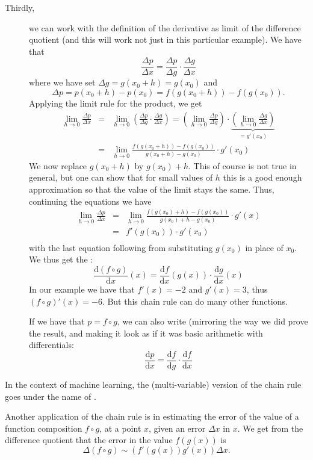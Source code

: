 \begin{description}
\item[Thirdly,] we can work with the definition of the derivative as limit
of the difference quotient (and this
will work not just in this particular example). We have that
\[
\frac{\Delta p}{\Delta x}=\frac{\Delta p}{\Delta g}\cdot\frac{\Delta
g}{\Delta x}
\]
where we have set $\Delta g=g(x_0+h)=g(x_0)$ and 
\[
\Delta p=p(x_0+h)-p(x_0)=f(g(x_0+h))-f(g(x_0)).
\]
Applying the limit rule for the product, we get
\begin{eqnarray*}
\lim_{h\to 0} \frac{\Delta p}{\Delta x}
&=&\lim_{h\to 0}\left(\frac{\Delta p}{\Delta g}\cdot\frac{\Delta g}{\Delta x}\right)
=\left(\lim_{h\to 0}\frac{\Delta p}{\Delta g}\right)\cdot\underbrace{\left(\lim_{h\to 0}\frac{\Delta
g}{\Delta x}\right)}_{=g'(x_0)}\\
&=&\lim_{h\to 0}\frac{f(g(x_0+h))-f(g(x_0))}{g(x_0+h)-g(x_0)}\cdot g'(x_0)
\end{eqnarray*}
We now replace $g(x_0+h)$ by $g(x_0)+h$. This of course is not true in
general, but one can show that for small values of $h$ this is a good
enough approximation so that the value of the limit stays the same. Thus,
continuing the equations we have
\begin{eqnarray*}
\lim_{h\to 0} \frac{\Delta p}{\Delta x}
&=&\lim_{h\to 0}\frac{f(g(x_0)+h)-f(g(x_0))}{g(x_0)+h-g(x_0)}\cdot g'(x)\\
&=&f'(g(x_0))\cdot g'(x_0)\\
\end{eqnarray*}
with the last equation following from substituting $g(x_0)$ in place of
$x_0$. We thus get the :
\[
\frac{\mbox{d}(f\circ
g)}{\mbox{d}x}(x)=\frac{\mbox{d}f}{\mbox{d}x}(g(x))\cdot
\frac{\mbox{d}g}{\mbox{d}x}(x)
\]
In our example we have that $f'(x)=-2$ and $g'(x)=3$, thus $(f\circ
g)'(x)=-6$. But this chain rule can do many other functions.
\smallskip

If we have that $p=f\circ g$, we can also write (mirroring the way we did
prove the result, and making it look as if it was basic arithmetic with
differentials:
\[
\frac{\mbox{d}p}{\mbox{d}x}=
\frac{\mbox{d}f}{\mbox{d}g}\cdot \frac{\mbox{d}f}{\mbox{d}x}
\]
\end{description}
In the context of machine learning, the (multi-variable) version of the
chain rule goes under the name of .
\smallskip

Another application of the chain rule is in estimating the error of the value of a function
composition $f\circ g$, at a point $x$, given an error $\Delta x$ in $x$. We
get from the difference quotient that the error in the value $f(g(x))$ is
\[
\Delta(f\circ g)\sim\left(f'(g(x))g'(x)\right)\Delta x.
\]

